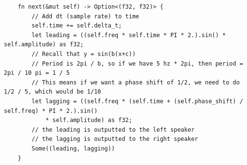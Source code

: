 \documentclass[index]{subfiles}
\begin{document}
\appendix
\begin{verbatim}
    fn next(&mut self) -> Option<(f32, f32)> {
        // Add dt (sample rate) to time
        self.time += self.delta_t;
        let leading = ((self.freq * self.time * PI * 2.).sin() * self.amplitude) as f32;
        // Recall that y = sin(b(x+c))
        // Period is 2pi / b, so if we have 5 hz * 2pi, then period = 2pi / 10 pi = 1 / 5
        // This means if we want a phase shift of 1/2, we need to do 1/2 / 5, which would be 1/10
        let lagging = ((self.freq * (self.time + (self.phase_shift) / self.freq) * PI * 2.).sin()
            * self.amplitude) as f32;
        // the leading is outputted to the left speaker
        // the lagging is outputted to the right speaker
        Some((leading, lagging))
    }
\end{verbatim}
\end{document}

